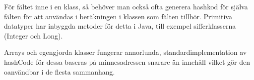 \documentclass[a5paper,10pt,oneside]{article}
\begin{document}
För fältet inne i en klass, så behöver man också ofta generera hashkod för själva fälten för att användas i beräkningen i klassen som fälten tillhör. 
Primitiva datatyper har inbyggda metoder för detta i Java, till exempel sifferklasserna (Integer och Long).

Arrays och egengjorda klasser fungerar annorlunda, standardimplementation av hashCode för dessa baseras på minnesadressen snarare än innehåll
vilket gör den oanvändbar i de flesta sammanhang.
\end{document}
